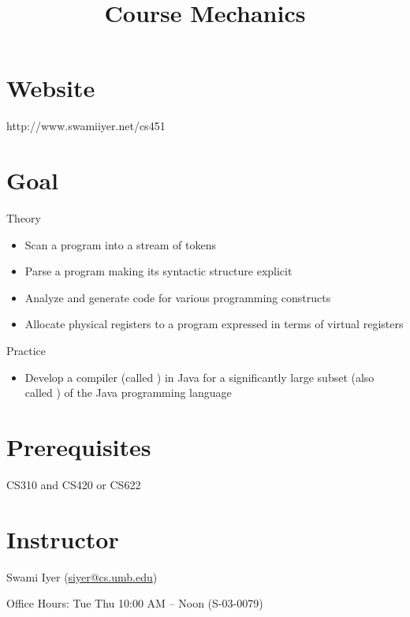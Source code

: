 \documentclass[8pt,a4paper,compress]{beamer}
\title{Course Mechanics}
\date{}
\begin{document}
\begin{frame}
\vfill
\titlepage
\end{frame}

\section{Website}
\begin{frame}[fragile]
\pause

http://www.swamiiyer.net/cs451
\end{frame}

\section{Goal}
\begin{frame}[fragile]
\pause

Theory
\begin{itemize}
\pause
\item Scan a program into a stream of tokens

\pause
\item Parse a program making its syntactic structure explicit

\pause
\item Analyze and generate code for various programming constructs

\pause
\item Allocate physical registers to a program expressed in terms of virtual registers
\end{itemize}

\pause\bigskip

Practice
\begin{itemize}
\pause
\item Develop a compiler (called \jmm) in Java for a significantly large subset (also called \jmm) of the Java programming language 
\end{itemize}


\end{frame}

\section{Prerequisites}
\begin{frame}[fragile]
\pause

CS310 and CS420 or CS622
\end{frame}

\section{Instructor}
\begin{frame}[fragile]
\pause

Swami Iyer (\href{siyer@cs.umb.edu}{siyer@cs.umb.edu})

\pause\bigskip

Office Hours: Tue Thu 10:00 AM -- Noon (S-03-0079)
\end{frame}
\end{document}
